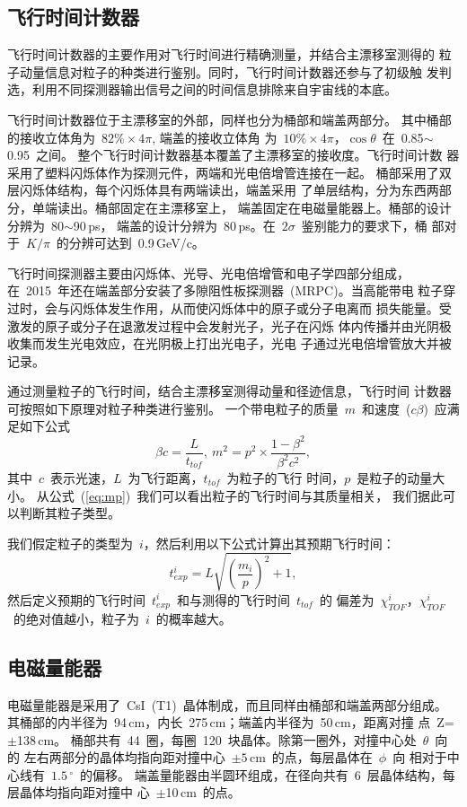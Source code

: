\subsection{飞行时间计数器}
\label{subsection:tof}
飞行时间计数器的主要作用对飞行时间进行精确测量，并结合主漂移室测得的
粒子动量信息对粒子的种类进行鉴别。同时，飞行时间计数器还参与了初级触
发判选，利用不同探测器输出信号之间的时间信息排除来自宇宙线的本底。

飞行时间计数器位于主漂移室的外部，同样也分为桶部和端盖两部分。
其中桶部的接收立体角为~$82\%\times 4\pi$, 端盖的接收立体角
为~$10\%\times 4\pi$，$\cos\theta$~在~0.85$\sim$0.95~之间。
整个飞行时间计数器基本覆盖了主漂移室的接收度。飞行时间计数
器采用了塑料闪烁体作为探测元件，两端和光电倍增管连接在一起。
桶部采用了双层闪烁体结构，每个闪烁体具有两端读出，端盖采用
了单层结构，分为东西两部分，单端读出。桶部固定在主漂移室上，
端盖固定在电磁量能器上。桶部的设计分辨为~80$\sim$90\,ps， 
端盖的设计分辨为~80\,ps。在~$2\sigma$~鉴别能力的要求下，桶
部对于~$K/\pi$~的分辨可达到~0.9\,GeV/c。

飞行时间探测器主要由闪烁体、光导、光电倍增管和电子学四部分组成，
在~2015~年还在端盖部分安装了多隙阻性板探测器~(MRPC)。当高能带电
粒子穿过时，会与闪烁体发生作用，从而使闪烁体中的原子或分子电离而
损失能量。受激发的原子或分子在退激发过程中会发射光子，光子在闪烁
体内传播并由光阴极收集而发生光电效应，在光阴极上打出光电子，光电
子通过光电倍增管放大并被记录。

通过测量粒子的飞行时间，结合主漂移室测得动量和径迹信息，飞行时间
计数器可按照如下原理对粒子种类进行鉴别。
一个带电粒子的质量~$m$~和速度~($c \beta$)~应满足如下公式
\begin{equation}
\beta c  = \frac{L}{t_{tof}},\ m^2 = p^2 \times \frac{1-\beta^2} {\beta^2c^2},
\label{eq:mp}
\end{equation}
其中~$c$~表示光速，$L$~为飞行距离，$t_{tof}$~为粒子的飞行
时间，$p$~是粒子的动量大小。
从公式~(\ref{eq:mp})~我们可以看出粒子的飞行时间与其质量相关，
我们据此可以判断其粒子类型。

我们假定粒子的类型为~$i$，然后利用以下公式计算出其预期飞行时间：
\begin{equation}
t^i_{exp} = L  \sqrt{(\frac{m_i}{p})^2 + 1 },
\end{equation}
然后定义预期的飞行时间~$t^i_{exp}$~和与测得的飞行时间~$t_{tof}$~的
偏差为~$\chi_{TOF}^i$，$\chi_{TOF}^i$~的绝对值越小，粒子为~$i$~的概率越大。

\subsection{电磁量能器}
\label{subsection:emc}
电磁量能器是采用了~CsI~(T1)~晶体制成，而且同样由桶部和端盖两部分组成。
其桶部的内半径为~94\,cm，内长~275\,cm；端盖内半径为~50\,cm，距离对撞
点~Z=$\pm$138\,cm。
桶部共有~44~圈，每圈~120~块晶体。除第一圈外，对撞中心处~$\theta$~向的
左右两部分的晶体均指向距对撞中心~$\pm5$\,cm~的点，每层晶体在~$\phi$~向
相对于中心线有~$1.5\,^{\circ}$~的偏移。
端盖量能器由半圆环组成，在径向共有~6~层晶体结构，每层晶体均指向距对撞中
心~$\pm$10\,cm~的点。

